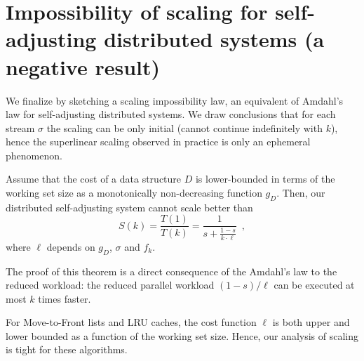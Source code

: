 













\section{Impossibility of scaling for self-adjusting distributed systems (a negative result)}


We finalize by sketching a scaling impossibility law, an equivalent of Amdahl's law for self-adjusting distributed systems. We draw conclusions that for each stream $\sigma$ the scaling can be only initial (cannot continue indefinitely with $k$), hence the superlinear scaling observed in practice is only an ephemeral phenomenon.


\begin{theorem}
Assume that the cost of a data structure $D$ is lower-bounded in terms of the working set size as a monotonically non-decreasing function $g_D$. 
Then, our distributed self-adjusting system cannot scale better than
 \begin{displaymath}
    S(k) = \frac{T(1)}{T(k)} = \frac{1}{s + \frac{1-s}{k \cdot \ell}} \enspace ,
  \end{displaymath}
  where $\ell$ depends on $g_D$, $\sigma$ and $f_k$.
\end{theorem}

The proof of this theorem is a direct consequence of the Amdahl's law to the reduced workload: the reduced parallel workload $(1-s)/\ell$ can be executed at most $k$ times faster.
 

For Move-to-Front lists and LRU caches, the cost function $\ell$ is both upper and lower bounded as a function of the working set size. Hence, our analysis of scaling is tight for these algorithms.

